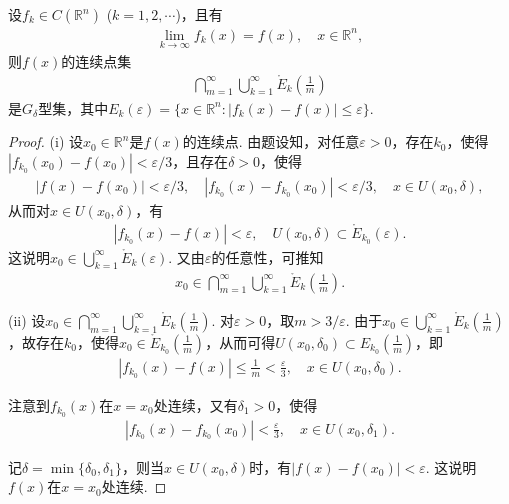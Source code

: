 \documentclass[../../main.tex]{subfiles}%
\begin{document}
\begin{example}\label{example:例12}
设$f_k\in C(\mathbb{R}^n)$ ($k = 1,2,\cdots$)，且有
\begin{align*}
\lim_{k\to\infty}f_k(x)=f(x), \quad x\in\mathbb{R}^n,
\end{align*}
则$f(x)$的连续点集
\begin{align*}
\bigcap_{m = 1}^{\infty}\bigcup_{k = 1}^{\infty}\mathring{E}_k\left(\frac{1}{m}\right)
\end{align*}
是$G_{\delta}$型集，其中$E_k(\varepsilon)=\{x\in\mathbb{R}^n: |f_k(x)-f(x)|\leqslant\varepsilon\}$.
\end{example}
\begin{proof}
(i) 设$x_0\in\mathbb{R}^n$是$f(x)$的连续点. 由题设知，对任意$\varepsilon>0$，存在$k_0$，使得$|f_{k_0}(x_0)-f(x_0)|<\varepsilon/3$，且存在$\delta>0$，使得
\begin{align*}
|f(x)-f(x_0)|<\varepsilon/3, \quad |f_{k_0}(x)-f_{k_0}(x_0)|<\varepsilon/3, \quad x\in U(x_0,\delta),
\end{align*}
从而对$x\in U(x_0,\delta)$，有
\begin{align*}
|f_{k_0}(x)-f(x)|<\varepsilon, \quad U(x_0,\delta)\subset\mathring{E}_{k_0}(\varepsilon).
\end{align*}
这说明$x_0\in\bigcup_{k = 1}^{\infty}\mathring{E}_k(\varepsilon)$. 又由$\varepsilon$的任意性，可推知
\begin{align*}
x_0\in\bigcap_{m = 1}^{\infty}\bigcup_{k = 1}^{\infty}\mathring{E}_k\left(\frac{1}{m}\right).
\end{align*}

(ii) 设$x_0\in\bigcap_{m = 1}^{\infty}\bigcup_{k = 1}^{\infty}\mathring{E}_k\left(\frac{1}{m}\right)$. 对$\varepsilon>0$，取$m>3/\varepsilon$. 由于$x_0\in\bigcup_{k = 1}^{\infty}\mathring{E}_k\left(\frac{1}{m}\right)$，故存在$k_0$，使得$x_0\in\mathring{E}_{k_0}\left(\frac{1}{m}\right)$，从而可得$U(x_0,\delta_0)\subset E_{k_0}\left(\frac{1}{m}\right)$，即
\begin{align*}
|f_{k_0}(x)-f(x)|\leqslant\frac{1}{m}<\frac{\varepsilon}{3}, \quad x\in U(x_0,\delta_0).
\end{align*}

注意到$f_{k_0}(x)$在$x = x_0$处连续，又有$\delta_1>0$，使得
\begin{align*}
|f_{k_0}(x)-f_{k_0}(x_0)|<\frac{\varepsilon}{3}, \quad x\in U(x_0,\delta_1).
\end{align*}

记$\delta=\min\{\delta_0,\delta_1\}$，则当$x\in U(x_0,\delta)$时，有$|f(x)-f(x_0)|<\varepsilon$. 这说明$f(x)$在$x = x_0$处连续. 
\end{proof}
\end{document}
